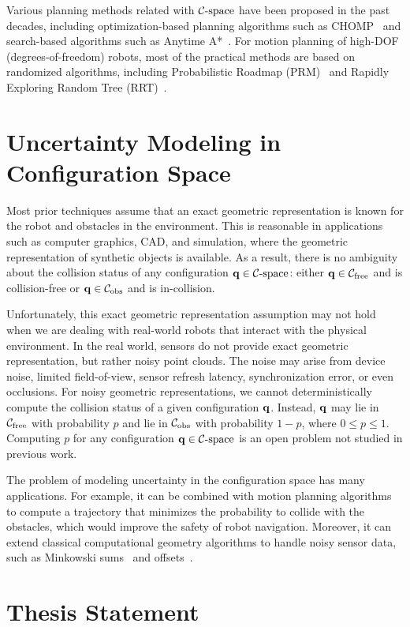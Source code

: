 Various planning methods related with $\mathcal C\text{-space}$ have been proposed in the past decades, including optimization-based planning algorithms such as CHOMP~\cite{Ratliff:2009} and search-based algorithms such as Anytime A*~\cite{Likhachev05anytimedynamic}. For motion planning of high-DOF (degrees-of-freedom) robots, most of the practical methods are based on randomized algorithms, including Probabilistic Roadmap (PRM)~\cite{Kavraki96} and Rapidly Exploring Random Tree (RRT)~\cite{Kuffner00}.


\section{Uncertainty Modeling in Configuration Space}
\label{sec:1:uncertainty}
Most prior techniques assume that an exact geometric representation is known for the robot and obstacles in the environment. This is reasonable in applications such as computer graphics, CAD, and simulation, where the geometric representation of synthetic objects is available. As a result, there is no ambiguity about the collision status of any configuration $\mathbf q \in \mathcal C\text{-space}$: either $\mathbf q \in \mathcal C_{\text{free}}$ and is collision-free or $\mathbf q \in \mathcal C_{\text{obs}}$ and is in-collision.

Unfortunately, this exact geometric representation assumption may not hold when we are dealing with real-world robots that interact with the physical environment. In the real world, sensors do not provide exact geometric representation, but rather noisy point clouds. The noise may arise from device noise, limited field-of-view, sensor refresh latency, synchronization error, or even occlusions. For noisy geometric representations, we cannot deterministically compute the collision status of a given configuration $\mathbf q$. Instead, $\mathbf q$ may lie in $\mathcal C_{\text{free}}$ with probability $p$ and lie in $\mathcal C_{\text{obs}}$ with probability $1-p$, where $0 \leq p \leq 1$. Computing $p$ for any configuration $\mathbf q \in \mathcal C\text{-space}$ is an open problem not studied in previous work.

The problem of modeling uncertainty in the configuration space has many applications. For example, it can be combined with motion planning algorithms to compute a trajectory that minimizes the probability to collide with the obstacles, which would improve the safety of robot navigation. Moreover, it can extend classical computational geometry algorithms to handle noisy sensor data, such as Minkowski sums~\cite{Varadhan:2006:TPA} and offsets~\cite{Choi:1997:CAD}.

\section{Thesis Statement}


